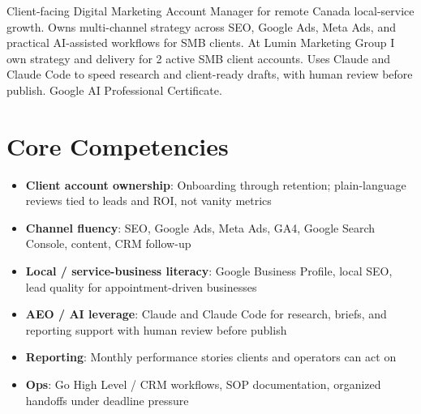 \documentclass[11pt,a4paper,sans]{moderncv}
\begin{document}
\makecvtitle

\vspace{6pt}
\small{Client-facing Digital Marketing Account Manager for remote Canada local-service growth. Owns multi-channel strategy across SEO, Google Ads, Meta Ads, and practical AI-assisted workflows for SMB clients. At Lumin Marketing Group I own strategy and delivery for 2 active SMB client accounts. Uses Claude and Claude Code to speed research and client-ready drafts, with human review before publish. Google AI Professional Certificate.}

\section{Core Competencies}
\vspace{1pt}
\begin{itemize}
\item \textbf{Client account ownership}: Onboarding through retention; plain-language reviews tied to leads and ROI, not vanity metrics
\item \textbf{Channel fluency}: SEO, Google Ads, Meta Ads, GA4, Google Search Console, content, CRM follow-up
\item \textbf{Local / service-business literacy}: Google Business Profile, local SEO, lead quality for appointment-driven businesses
\item \textbf{AEO / AI leverage}: Claude and Claude Code for research, briefs, and reporting support with human review before publish
\item \textbf{Reporting}: Monthly performance stories clients and operators can act on
\item \textbf{Ops}: Go High Level / CRM workflows, SOP documentation, organized handoffs under deadline pressure
\end{itemize}
\end{document}
